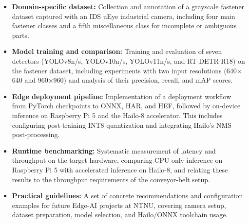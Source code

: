 \documentclass[12pt,a4paper]{report}
\begin{document}
    \begin{itemize}
        \item \textbf{Domain-specific dataset:} Collection and annotation of a grayscale fastener dataset captured
              with an IDS uEye industrial camera, including four main fastener classes and a fifth miscellaneous
              class for incomplete or ambiguous parts.

        \item \textbf{Model training and comparison:} Training and evaluation of seven detectors
              (YOLOv8n/s, YOLOv10n/s, YOLOv11n/s, and RT-DETR-R18) on the fastener dataset, including experiments
              with two input resolutions (640$\times$640 and 960$\times$960) and analysis of their precision, recall,
              and mAP scores.

        \item \textbf{Edge deployment pipeline:} Implementation of a deployment workflow from PyTorch
              checkpoints to ONNX, HAR, and HEF, followed by on-device inference on Raspberry Pi 5 and the Hailo-8
              accelerator. This includes configuring post-training INT8 quantization and integrating Hailo’s NMS
              post-processing.

        \item \textbf{Runtime benchmarking:} Systematic measurement of latency and throughput on the target hardware,
              comparing CPU-only inference on Raspberry Pi 5 with accelerated inference on Hailo-8, and relating these
              results to the throughput requirements of the conveyor-belt setup.

        \item \textbf{Practical guidelines:} A set of concrete recommendations and configuration examples for future
              Edge-AI projects at NTNU, covering camera setup, dataset preparation, model selection, and Hailo/ONNX
              toolchain usage.
    \end{itemize}
\end{document}
